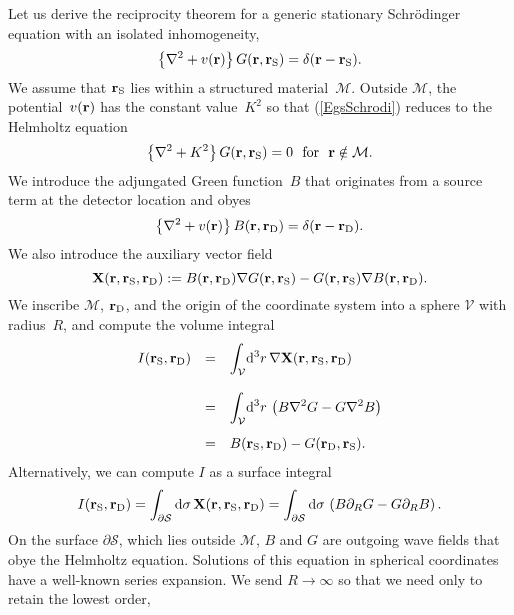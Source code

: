 Let us derive the reciprocity theorem
for a generic stationary Schrödinger equation
with an isolated inhomogeneity,
\begin{equation}\label{EgsSchrodi}
  \left\{\mathbf{\nabla}^2+v(\mathbf{r})\right\}G(\mathbf{r},\mathbf{r}_{\rm S}) = \delta(\mathbf{r}-\mathbf{r}_{\rm S}).
\end{equation}
We assume that $\mathbf{r}_{\rm S}$ lies within a structured material~$\mathcal{M}$.
Outside $\mathcal{M}$,
the potential~$v(\mathbf{r})$ has the constant value~$K^2$
so that (\ref{EgsSchrodi})
reduces to the Helmholtz equation
\begin{equation}\label{EgsSchrodiHelmh}
  \left\{\mathbf{\nabla}^2+K^2\right\}G(\mathbf{r},\mathbf{r}_{\rm S}) = 0
  \text{~~for~~}\mathbf{r}\notin\mathcal{M}.
\end{equation}
We introduce the adjungated Green function~$B$
that originates from a source term at the detector location
and obyes
\begin{equation}\label{EgsSchrodiAdj}
  \left\{\mathbf{\nabla}^2+v(\mathbf{r})\right\}B(\mathbf{r},\mathbf{r}_{\rm D}) = \delta(\mathbf{r}-\mathbf{r}_{\rm D}).
\end{equation}
We also introduce the auxiliary vector field
\begin{equation}
  \mathbf{X}(\mathbf{r},\mathbf{r}_{\rm S},\mathbf{r}_{\rm D}):=B(\mathbf{r},\mathbf{r}_{\rm D})\mathbf{\nabla} G(\mathbf{r},\mathbf{r}_{\rm S}) - G(\mathbf{r},\mathbf{r}_{\rm S})\mathbf{\nabla} B(\mathbf{r},\mathbf{r}_{\rm D}).
\end{equation}
We inscribe $\mathcal{M}$, $\mathbf{r}_{\rm D}$, and the origin of the coordinate system
into a sphere $\mathcal{V}$ with radius~$R$,
and compute the volume integral
\begin{equation}\label{Eprerecipro}
  \begin{array}{lcl}
    I(\mathbf{r}_{\rm S},\mathbf{r}_{\rm D})
  &=& \displaystyle\int_\mathcal{V}\!{\rm d}^3r\,\mathbf{\nabla} \mathbf{X}(\mathbf{r},\mathbf{r}_{\rm S},\mathbf{r}_{\rm D})
  \\[1.8em]
  &=& \displaystyle\int_\mathcal{V}\!{\rm d}^3r\,\left(
    B\mathbf{\nabla}^2 G- G\mathbf{\nabla}^2 B \right)
  \\[1.4em]
  &=&  B(\mathbf{r}_{\rm S},\mathbf{r}_{\rm D}) - G(\mathbf{r}_{\rm D},\mathbf{r}_{\rm S}).
  \end{array}
\end{equation}
Alternatively, we can compute $I$ as a surface integral
\begin{equation}
  I(\mathbf{r}_{\rm S},\mathbf{r}_{\rm D})
  =\displaystyle\int_{\partial\mathcal{S}}{\rm d}\mathbf{\sigma}\,\mathbf{X}(\mathbf{r},\mathbf{r}_{\rm S},\mathbf{r}_{\rm D})
  =\displaystyle\int_{\partial\mathcal{S}}{\rm d}{\sigma}\,
       \left(B\partial_R G - G\partial_R B\right).
\end{equation}
On the surface $\partial\mathcal{S}$, which lies outside $\mathcal{M}$,
$B$ and $G$ are outgoing wave fields that obye the Helmholtz equation.
Solutions of this equation in spherical coordinates
have a well-known series expansion.
We send $R\to\infty$ so that we need only to retain the lowest order,
